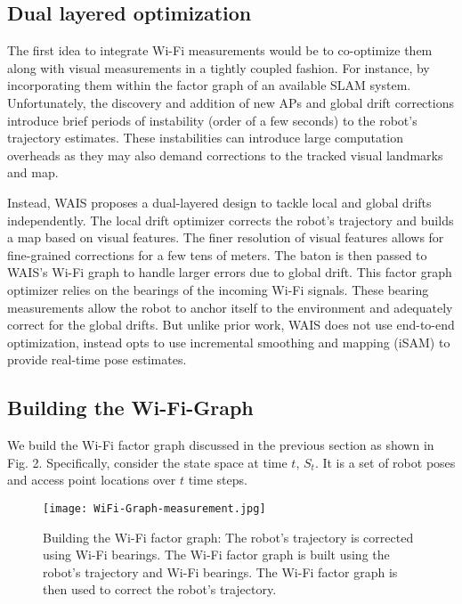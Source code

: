 \documentclass[
	a4paper, %
	11pt, %
	unnumberedsections, %
	twoside, %
]{LTJournalArticle}
\begin{document}
\subsection{Dual layered optimization}
The first idea to integrate Wi-Fi measurements would be to co-optimize them along with visual measurements in a tightly coupled fashion. For instance, by incorporating them within the factor graph of an available SLAM system. Unfortunately, the discovery and addition of new APs and global drift corrections introduce brief periods of instability (order of a few seconds) to the robot’s trajectory estimates. These instabilities can introduce large computation overheads as they may also demand corrections to the tracked visual landmarks and map.

Instead, WAIS proposes a dual-layered design to tackle local and global drifts independently. The local drift optimizer corrects the robot’s trajectory and builds a map based on visual features. The finer resolution of visual features allows for fine-grained corrections for a few tens of meters. The baton is then passed to WAIS’s Wi-Fi graph to handle larger errors due to global drift. This factor graph optimizer relies on the bearings of the incoming Wi-Fi signals. These bearing measurements allow the robot to anchor itself to the environment and adequately correct for the global drifts. But unlike prior work, WAIS does not use end-to-end optimization, instead opts to use incremental smoothing and mapping (iSAM) to provide real-time pose estimates.

\subsection{Building the Wi-Fi-Graph}

We build the Wi-Fi factor graph discussed in the previous section as shown in Fig. 2. Specifically, consider the state space at time $t$, $S_t$. It is a set of robot poses and access point locations over $t$ time steps.

\begin{figure}[h]
	\centering
	\texttt{[image: WiFi-Graph-measurement.jpg]}
	\caption{Building the Wi-Fi factor graph: The robot’s trajectory is corrected using Wi-Fi bearings. The Wi-Fi factor graph is built using the robot’s trajectory and Wi-Fi bearings. The Wi-Fi factor graph is then used to correct the robot’s trajectory.}
	\label{fig:WiFi-Graph-measurement}
\end{figure}
\end{document}
